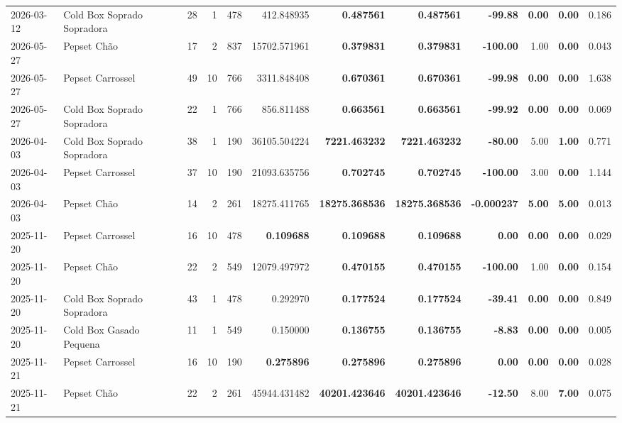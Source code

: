 {\begin{center}
{\begin{tabular}{@{}llrrrrrrrrrr@{}}
2026-03-12 & Cold Box Soprado Sopradora & 28 & 1 & 478 & 412.848935 & \textbf{0.487561} & \textbf{0.487561} & \textbf{-99.88} & \textbf{0.00} & \textbf{0.00} & 0.186 \\
2026-05-27 & Pepset Chão & 17 & 2 & 837 & 15702.571961 & \textbf{0.379831} & \textbf{0.379831} & \textbf{-100.00} & 1.00 & \textbf{0.00} & 0.043 \\
2026-05-27 & Pepset Carrossel & 49 & 10 & 766 & 3311.848408 & \textbf{0.670361} & \textbf{0.670361} & \textbf{-99.98} & \textbf{0.00} & \textbf{0.00} & 1.638 \\
2026-05-27 & Cold Box Soprado Sopradora & 22 & 1 & 766 & 856.811488 & \textbf{0.663561} & \textbf{0.663561} & \textbf{-99.92} & \textbf{0.00} & \textbf{0.00} & 0.069 \\
2026-04-03 & Cold Box Soprado Sopradora & 38 & 1 & 190 & 36105.504224 & \textbf{7221.463232} & \textbf{7221.463232} & \textbf{-80.00} & 5.00 & \textbf{1.00} & 0.771 \\
2026-04-03 & Pepset Carrossel & 37 & 10 & 190 & 21093.635756 & \textbf{0.702745} & \textbf{0.702745} & \textbf{-100.00} & 3.00 & \textbf{0.00} & 1.144 \\
2026-04-03 & Pepset Chão & 14 & 2 & 261 & 18275.411765 & \textbf{18275.368536} & \textbf{18275.368536} & \textbf{-0.000237} & \textbf{5.00} & \textbf{5.00} & 0.013 \\
2025-11-20 & Pepset Carrossel & 16 & 10 & 478 & \textbf{0.109688} & \textbf{0.109688} & \textbf{0.109688} & \textbf{0.00} & \textbf{0.00} & \textbf{0.00} & 0.029 \\
2025-11-20 & Pepset Chão & 22 & 2 & 549 & 12079.497972 & \textbf{0.470155} & \textbf{0.470155} & \textbf{-100.00} & 1.00 & \textbf{0.00} & 0.154 \\
2025-11-20 & Cold Box Soprado Sopradora & 43 & 1 & 478 & 0.292970 & \textbf{0.177524} & \textbf{0.177524} & \textbf{-39.41} & \textbf{0.00} & \textbf{0.00} & 0.849 \\
2025-11-20 & Cold Box Gasado Pequena & 11 & 1 & 549 & 0.150000 & \textbf{0.136755} & \textbf{0.136755} & \textbf{-8.83} & \textbf{0.00} & \textbf{0.00} & 0.005 \\
2025-11-21 & Pepset Carrossel & 16 & 10 & 190 & \textbf{0.275896} & \textbf{0.275896} & \textbf{0.275896} & \textbf{0.00} & \textbf{0.00} & \textbf{0.00} & 0.028 \\
2025-11-21 & Pepset Chão & 22 & 2 & 261 & 45944.431482 & \textbf{40201.423646} & \textbf{40201.423646} & \textbf{-12.50} & 8.00 & \textbf{7.00} & 0.075 \\

\end{tabular}}
\end{center}}
